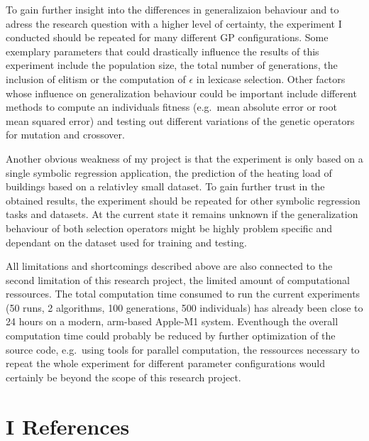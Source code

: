 \documentclass[
  12pt,
]{article}
\begin{document}
To gain further insight into the differences in generalizaion behaviour
and to adress the research question with a higher level of certainty,
the experiment I conducted should be repeated for many different GP
configurations. Some exemplary parameters that could drastically
influence the results of this experiment include the population size,
the total number of generations, the inclusion of elitism or the
computation of \(\epsilon\) in lexicase selection. Other factors whose
influence on generalization behaviour could be important include
different methods to compute an individuals fitness (e.g.~mean absolute
error or root mean squared error) and testing out different variations
of the genetic operators for mutation and crossover.

Another obvious weakness of my project is that the experiment is only
based on a single symbolic regression application, the prediction of the
heating load of buildings based on a relativley small dataset. To gain
further trust in the obtained results, the experiment should be repeated
for other symbolic regression tasks and datasets. At the current state
it remains unknown if the generalization behaviour of both selection
operators might be highly problem specific and dependant on the dataset
used for training and testing.

All limitations and shortcomings described above are also connected to
the second limitation of this research project, the limited amount of
computational ressources. The total computation time consumed to run the
current experiments (50 runs, 2 algorithms, 100 generations, 500
individuals) has already been close to 24 hours on a modern, arm-based
Apple-M1 system. Eventhough the overall computation time could probably
be reduced by further optimization of the source code, e.g.~using tools
for parallel computation, the ressources necessary to repeat the whole
experiment for different parameter configurations would certainly be
beyond the scope of this research project.

\newpage

\hypertarget{I}{%
\section*{I References}\label{I}}
\end{document}
